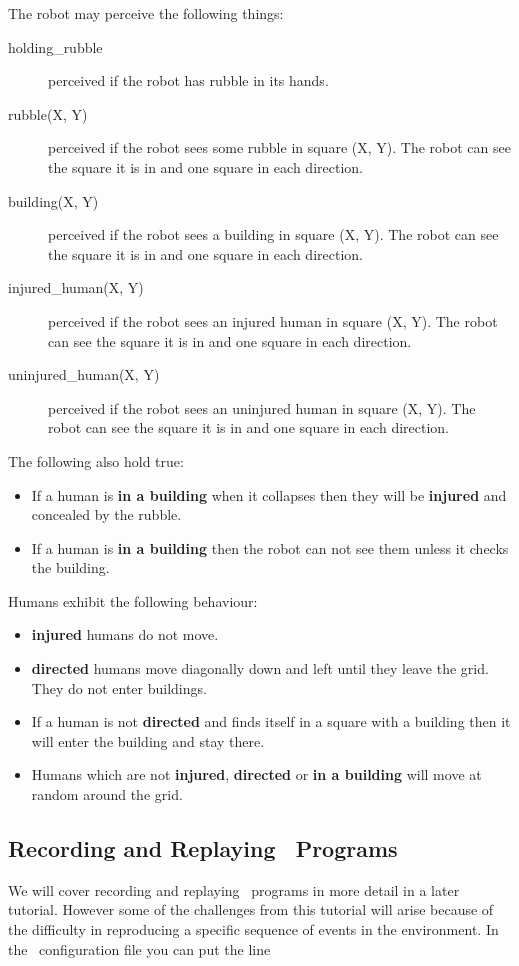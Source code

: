 The robot may perceive the following things:
\begin{description}
\item[holding\_rubble] perceived if the robot has rubble in its hands.
\item[rubble(X, Y)] perceived if the robot sees some rubble in square (X, Y).  The robot can see the square it is in and one square in each direction.
\item[building(X, Y)] perceived if the robot sees a building in square (X, Y).  The robot can see the square it is in and one square in each direction.
\item[injured\_human(X, Y)] perceived if the robot sees an injured human in square (X, Y).  The robot can see the square it is in and one square in each direction.
\item[uninjured\_human(X, Y)] perceived if the robot sees an uninjured human in square (X, Y).  The robot can see the square it is in and one square in each direction.
\end{description}

The following also hold true:
\begin{itemize}
\item If a human is {\bf in a building} when it collapses then they will be {\bf injured} and concealed by the rubble.
\item If a human is {\bf in a building} then the robot can not see them unless it checks the building.
\end{itemize}

Humans exhibit the following behaviour:
\begin{itemize}
\item {\bf injured} humans do not move.
\item {\bf directed} humans move diagonally down and left until they leave the grid.  They do not enter buildings.
\item If a human is not {\bf directed} and finds itself in a square with a building then it will enter the building and stay there.
\item Humans which are not {\bf injured}, {\bf directed} or {\bf in a building} will move at random around the grid.
\end{itemize}

\subsection{Recording and Replaying \ail\ Programs}
We will cover recording and replaying \ail\ programs in more detail in a later tutorial.  However some of the challenges from this tutorial will arise because of the difficulty in reproducing a specific sequence of events in the environment.  In the \ail\ configuration file you can put the line

